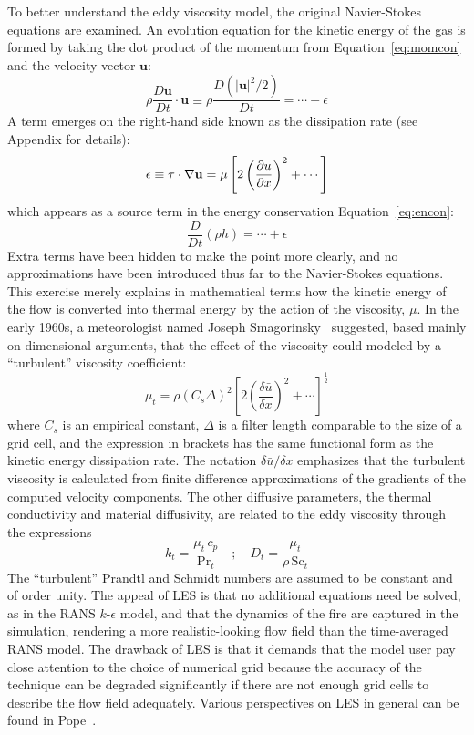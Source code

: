 \documentclass[graybox]{svmult}
\begin{document}
To better understand the eddy viscosity model, the original Navier-Stokes equations are examined. An evolution equation for the kinetic energy of the gas is formed by taking the dot product of the momentum from Equation~\ref{eq:momcon} and the velocity vector $\mathbf{u}$:
\begin{equation}
\rho \frac{D \mathbf{u}}{Dt} \cdot \mathbf{u} \equiv \rho \frac{D(|\mathbf{u}|^2/2)}{Dt} = \cdots - \epsilon
\label{eq:momdotu}
\end{equation}
A term emerges on the right-hand side known as the dissipation rate (see Appendix for details):
\begin{equation}
\epsilon \equiv \tens{\tau} \cdot \nabla \mathbf{u} = \mu \left[ 2 \left( \frac{\partial u}{\partial x} \right)^2 + \cdots \right]
\label{eq:epsilondef}
\end{equation}
which appears as a source term in the energy conservation Equation~\ref{eq:encon}:
\begin{equation}
\frac{D}{Dt} (\rho h) = \cdots + \epsilon
\end{equation}
Extra terms have been hidden to make the point more clearly, and no approximations have been introduced thus far to the Navier-Stokes equations. This exercise merely explains in mathematical terms how the kinetic energy of the flow is converted into thermal energy by the action of the viscosity, $\mu$. In the early 1960s, a meteorologist named Joseph Smagorinsky~\cite{Smagorinsky} suggested, based mainly on dimensional arguments, that the effect of the viscosity could modeled by a ``turbulent'' viscosity coefficient:
\begin{equation}
\mu_t = \rho (C_s \Delta)^2 \left[ 2 \left( \frac{\delta \bar{u}}{\delta x} \right)^2 + \cdots \right]^{\frac{1}{2}}
\label{eq:muLES}
\end{equation}
where $C_s$ is an empirical constant, $\Delta$ is a filter length comparable to the size of a grid cell, and the expression in brackets has the same functional form as the kinetic energy dissipation rate. The notation $\delta \bar{u}/\delta x$ emphasizes that the turbulent viscosity is calculated from finite difference approximations of the gradients of the computed velocity components. The other diffusive parameters, the thermal conductivity and material diffusivity, are related to the eddy viscosity through the expressions
\begin{equation}
k_t = \frac{\mu_t \, c_p}{\mathrm{Pr}_t} \quad ; \quad D_t = \frac{\mu_t}{\rho \, \mathrm{Sc}_t}
\end{equation}
The ``turbulent'' Prandtl and Schmidt numbers are assumed to be constant and of order unity. The appeal of LES is that no additional equations need be solved, as in the RANS $k$-$\epsilon$  model, and that the dynamics of the fire are captured in the simulation, rendering a more realistic-looking flow field than the time-averaged RANS model. The drawback of LES is that it demands that the model user pay close attention to the choice of numerical grid because the accuracy of the technique can be degraded significantly if there are not enough grid cells to describe the flow field adequately. Various perspectives on LES in general can be found in Pope~\cite{Pope}.
\end{document}
